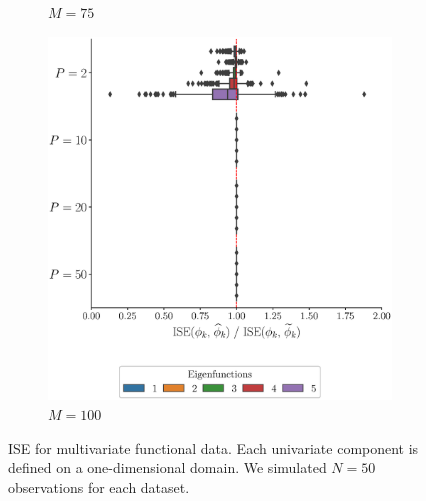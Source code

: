 \begin{results}
\begin{figure}
\begin{subfigure}[b]{0.49\textwidth}
         \caption{$M = 75$}
         \label{fig:ise_mfd_1d_75}
     \end{subfigure}
     \begin{subfigure}[b]{0.49\textwidth}
         \centering
         \includegraphics[width=\textwidth]{figures/scenario_1/ise_N50_M100.eps}
         \caption{$M = 100$}
         \label{fig:ise_mfd_1d_100}
    \end{subfigure}
    \caption{ISE for multivariate functional data. Each univariate component is defined on a one-dimensional domain. We simulated $N = 50$ observations for each dataset.}
    \label{fig:ise_mfd_1d}
\end{figure}


\end{results}
